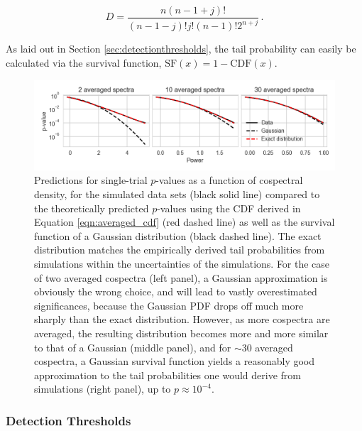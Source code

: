 \documentclass[12pt]{emulateapj}
\begin{document}
\[
D = \frac{n(n-1+j)!}{(n-1-j)! j! (n-1)! 2^{n+j}} \, .
\]

\noindent As laid out in Section \ref{sec:detectionthresholds}, the tail probability can easily be calculated via the survival function, $\mathrm{SF}(x) = 1 - \mathrm{CDF}(x)$. 


\begin{figure}
\begin{center}
\includegraphics[width=\textwidth]{avg_pvalues.png}
\caption{Predictions for single-trial $p$-values as a function of cospectral density, for the simulated data sets (black solid line) compared to the theoretically predicted $p$-values using the CDF derived in Equation \ref{eqn:averaged_cdf} (red dashed line) as well as the survival function of a Gaussian distribution (black dashed line). The exact distribution matches the empirically derived tail probabilities from simulations within the uncertainties of the simulations. For the case of two averaged cospectra (left panel), a Gaussian approximation is obviously the wrong choice, and will lead to vastly overestimated significances, because the Gaussian PDF drops off much more sharply than the exact distribution. However, as more cospectra are averaged, the resulting distribution becomes more and more similar to that of a Gaussian (middle panel), and for $\sim$30 averaged cospectra, a Gaussian survival function yields a reasonably good approximation to the tail probabilities one would derive from simulations (right panel), up to $p \approx 10^{-4}$.}
\label{fig:avg_pvalue}
\end{center}
\end{figure}

\subsubsection{Detection Thresholds}
\label{sec:averaged_detthres}
\end{document}
